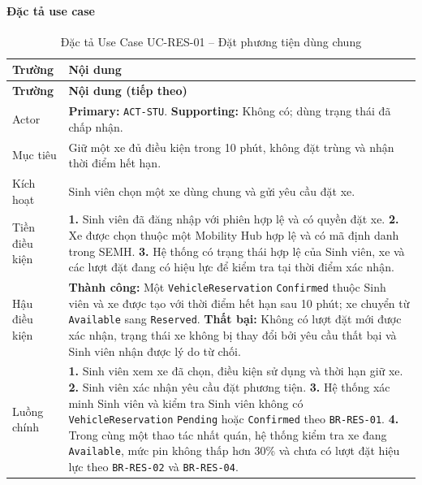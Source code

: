 \paragraph{Đặc tả use case}
\small
\begin{longtable}{|L{26mm}|L{118mm}|}
  \caption{Đặc tả Use Case UC-RES-01 -- Đặt phương tiện dùng chung}\label{tab:spec-UC-RES-01}\\
  \hline
  \centering\arraybackslash\textbf{Trường} & \centering\arraybackslash\textbf{Nội dung}\\
  \hline
  \endfirsthead
  \hline
  \centering\arraybackslash\textbf{Trường} & \centering\arraybackslash\textbf{Nội dung (tiếp theo)}\\
  \hline
  \endhead
  Actor & \textbf{Primary:} \texttt{ACT-STU}. \textbf{Supporting:} Không có; dùng trạng thái đã chấp nhận.\\\hline
  Mục tiêu & Giữ một xe đủ điều kiện trong 10 phút, không đặt trùng và nhận thời điểm hết hạn.\\\hline
  Kích hoạt & Sinh viên chọn một xe dùng chung và gửi yêu cầu đặt xe.\\\hline
  Tiền điều kiện &
    \textbf{1.} Sinh viên đã đăng nhập với phiên hợp lệ và có quyền đặt xe.\newline
    \textbf{2.} Xe được chọn thuộc một Mobility Hub hợp lệ và có mã định danh trong SEMH.\newline
    \textbf{3.} Hệ thống có trạng thái hợp lệ của Sinh viên, xe và các lượt đặt đang có hiệu lực để kiểm tra tại thời điểm xác nhận.\\\hline
  Hậu điều kiện &
    \textbf{Thành công:} Một \texttt{VehicleReservation} \texttt{Confirmed} thuộc Sinh viên và xe được tạo với thời điểm hết hạn sau 10 phút; xe chuyển từ \texttt{Available} sang \texttt{Reserved}.\newline
    \textbf{Thất bại:} Không có lượt đặt mới được xác nhận, trạng thái xe không bị thay đổi bởi yêu cầu thất bại và Sinh viên nhận được lý do từ chối.\\\hline
  Luồng chính &
    \textbf{1.} Sinh viên xem xe đã chọn, điều kiện sử dụng và thời hạn giữ xe.\newline
    \textbf{2.} Sinh viên xác nhận yêu cầu đặt phương tiện.\newline
    \textbf{3.} Hệ thống xác minh Sinh viên và kiểm tra Sinh viên không có \texttt{VehicleReservation} \texttt{Pending} hoặc \texttt{Confirmed} theo \texttt{BR-RES-01}.\newline
    \textbf{4.} Trong cùng một thao tác nhất quán, hệ thống kiểm tra xe đang \texttt{Available}, mức pin không thấp hơn 30\% và chưa có lượt đặt hiệu lực theo \texttt{BR-RES-02} và \texttt{BR-RES-04}.\newline

\end{longtable}
